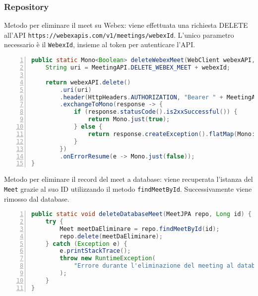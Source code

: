 \subsubsection{Repository}
\noindent Metodo per eliminare il meet su Webex: viene effettuata una richiesta DELETE all'API \texttt{https://webexapis.com/v1/meetings/webexId}.
L'unico parametro necessario è il \texttt{WebexId}, insieme al token per autenticare l'API.
\begin{lstlisting}[language=java, frame=lines, basicstyle=\ttfamily\scriptsize, numbers=left]
 public static Mono<Boolean> deleteWebexMeet(WebClient webexAPI, String webexId) {
	String uri = MeetingAPI.DELETE_WEBEX_MEET + webexId;

	return webexAPI.delete()
	    .uri(uri)
	    .header(HttpHeaders.AUTHORIZATION, "Bearer " + MeetingAPI.TOKEN)
	    .exchangeToMono(response -> {
	        if (response.statusCode().is2xxSuccessful()) {
	            return Mono.just(true);
	        } else {
	            return response.createException().flatMap(Mono::error);
	        }
	    })
	    .onErrorResume(e -> Mono.just(false));
}
\end{lstlisting}
\noindent Metodo per eliminare il record del meet a database: viene recuperata l'istanza del \texttt{Meet} grazie al suo ID
utilizzando il metodo \texttt{findMeetById}. Successivamente viene rimosso dal database.
\begin{lstlisting}[language=java, frame=lines, basicstyle=\ttfamily\scriptsize, numbers=left]
public static void deleteDatabaseMeet(MeetJPA repo, Long id) {	
    try {     
        Meet meetDaEliminare = repo.findMeetById(id);      
        repo.delete(meetDaEliminare);      
    } catch (Exception e) {
        e.printStackTrace();
        throw new RuntimeException(
            "Errore durante l'eliminazione del meeting al database", e
        );
    }
}
\end{lstlisting}